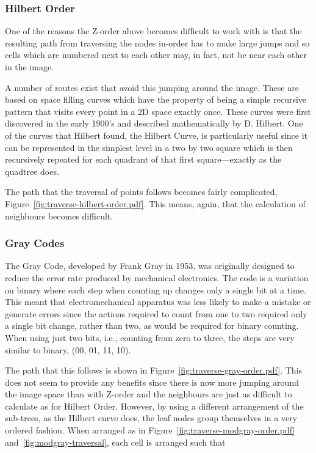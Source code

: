 \subsubsection{Hilbert Order}
\label{ssub:hilbert_order}

One of the reasons the Z-order above becomes difficult to work with is that
the resulting path from traversing the nodes in-order has to make large jumps
and so cells which are numbered next to each other may, in fact, not be near
each other in the image.

A number of routes exist that avoid this jumping around the image. These are
based on space filling curves which have the property of being a simple
recursive pattern that visits every point in a 2D space exactly once. These
curves were first discovered in the early 1900's and described mathematically
by D. Hilbert\cite{hilbert1970stetige}. One of the curves that Hilbert found,
the Hilbert Curve, is particularly useful since it can be represented in the
simplest level in a two by two square which is then recursively repeated for
each quadrant of that first square---exactly as the quadtree does.

The path that the traversal of points follows becomes fairly complicated,
Figure~\ref{fig:traverse-hilbert-order.pdf}. This means, again, that the
calculation of neighbours becomes difficult.

\subsubsection{Gray Codes}
\label{ssub:gray_codes}

The Gray Code\cite{gray1953pulse}, developed by Frank Gray in 1953, was
originally designed to reduce the error rate produced by mechanical
electronics. The code is a variation on binary where each step when counting
up changes only a single bit at a time. This meant that electromechanical
apparatus was less likely to make a mistake or generate errors since the
actions required to count from one to two required only a single bit change,
rather than two, as would be required for binary counting. When using just two
bits, i.e., counting from zero to three, the steps are very similar to binary,
(00, 01, 11, 10).

The path that this follows is shown in
Figure~\ref{fig:traverse-gray-order.pdf}. This does not seem to provide any
benefits since there is now more jumping around the image space than with
Z-order and the neighbours are just as difficult to calculate as for Hilbert
Order. However, by using a different arrangement of the sub-trees, as the
Hilbert curve does, the leaf nodes group themselves in a very ordered
fashion. When arranged as in Figure~\ref{fig:traverse-modgray-order.pdf}
and~\ref{fig:modgray-traversal}, each cell is arranged such that

